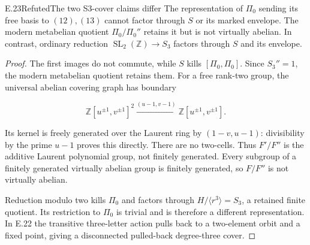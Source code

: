 \begin{statement}{E.23}{Refuted}{The two S3-cover claims differ}
The representation of $\Pi_0$ sending its free basis
to $(12),(13)$ cannot factor through $S$ or its marked
envelope. The modern metabelian quotient
$\Pi_0/\Pi_0''$ retains it but is not virtually abelian.
In contrast, ordinary reduction
$\operatorname{SL}_2(\mathbb Z)\to S_3$ factors through
$S$ and its envelope.
\end{statement}
\begin{proof}
The first images do not commute, while $S$ kills
$[\Pi_0,\Pi_0]$. Since $S_3''=1$, the modern metabelian
quotient retains them.
For a free rank-two group, the universal abelian
covering graph has boundary

$$
\mathbb Z[u^{\pm1},v^{\pm1}]^2
 \xrightarrow{(u-1,v-1)}\mathbb Z[u^{\pm1},v^{\pm1}].
$$

Its kernel is freely generated over the Laurent ring
by $(1-v,u-1)$: divisibility by the prime $u-1$
proves this directly. There are no two-cells.
Thus $F'/F''$ is the additive Laurent polynomial group,
not finitely generated. Every subgroup of a finitely
generated virtually abelian group is finitely generated,
so $F/F''$ is not virtually abelian.

Reduction modulo two kills $\Pi_0$ and factors through
$H/\langle r^3\rangle=S_3$, a retained finite quotient.
Its restriction to $\Pi_0$ is trivial and is therefore
a different representation.
In E.22 the transitive three-letter action pulls back
to a two-element orbit and a fixed point, giving a
disconnected pulled-back degree-three cover.
\end{proof}

